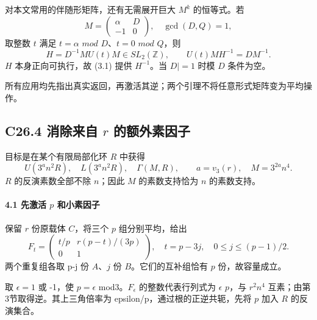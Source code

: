 {对本文常用的伴随形矩阵，还有无需展开巨大} {\ensuremath{M^{k}}} {的恒等式。若} \[
M=\begin{pmatrix}\alpha&D\\-1&0\end{pmatrix},
\quad \gcd(D,Q)=1,
\] {取整数} {\ensuremath{t}} {满足} {\ensuremath{t=\alpha }} {\ensuremath{mod}} {\ensuremath{D}、\ensuremath{t=0}} {\ensuremath{mod}} {\ensuremath{Q}，则} \[
H=D^{-1}MU(t)M\in SL_2(\mathbb Z),\qquad
U(t)MH^{-1}=DM^{-1}.
\tag{C26.3.2}
\] {\ensuremath{H}} {本身正向可执行，故} {(3.1)} {提供} {\ensuremath{H^{-1}}。当} {\textbar{}\ensuremath{D|=1}} {时模} {\ensuremath{D}} {条件为空。}

{所有应用均先指出真实返回，再激活其逆；两个引理不将任意形式矩阵变为平均操作。}

\subsection*{\texorpdfstring{{C26.4} {消除来自} {\ensuremath{r}} {的额外素因子}}{C26.4 消除来自  的额外素因子}}\label{C26-h160}

{目标是在某个有限局部化环} {\ensuremath{R}} {中获得} \[
U(3^a n^2R),\quad L(3^a n^2R),\quad
\Gamma(M,R),\qquad
a=v_3(r),\quad M=3^{2a}n^4.
\tag{C26.4.1}
\] {\ensuremath{R}} {的反演素数全部不除} {\ensuremath{n}；因此} {\ensuremath{M}} {的素数支持恰为} {\ensuremath{n}} {的素数支持。}

\paragraph*{\texorpdfstring{{4.1} {先激活} {\ensuremath{p}} {和小素因子}}{4.1 先激活  和小素因子}}\label{C26-h161}

{保留} {\ensuremath{r}} {份原载体} {\ensuremath{C}，将三个} {\ensuremath{p}} {组分别平均，给出} \[
F_t=\begin{pmatrix}t/p&r(p-t)/(3p)\\0&1\end{pmatrix},
\quad t=p-3j,\quad0\le j\le(p-1)/2.
\tag{C26.4.2}
\] {两个重复组各取} {p-j} {份} {\ensuremath{A}、\ensuremath{j}} {份} {\ensuremath{B}。它们的互补组恰有} {\ensuremath{p}} {份，故容量成立。}

{取} {\ensuremath{\epsilon =1}} {或} {-1，使} {\ensuremath{p=\epsilon }} {mod3。\ensuremath{F_\epsilon }} {的整数代表行列式为} {\ensuremath{\epsilon }} {\ensuremath{p}，与} {\ensuremath{r^{2}n^{4}}} {互素；由第3节取得逆。其上三角倍率为} {epsilon/p，通过根的正逆共轭，先将} {\ensuremath{p}} {加入} {\ensuremath{R}} {的反演集合。}


